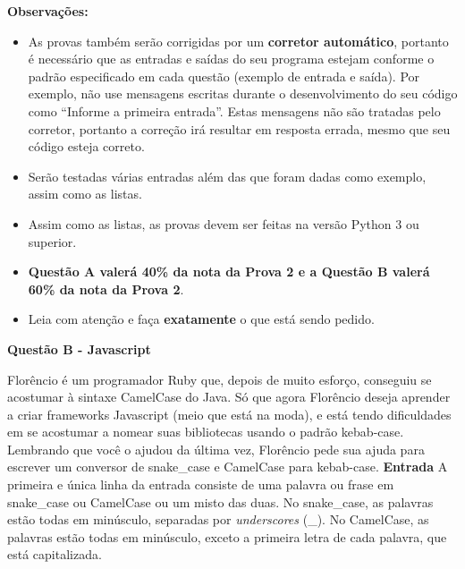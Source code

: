 \documentclass[a4paper, 12pt]{article}
\begin{document}
\textbf{{\large Observações:}}
\begin{itemize}
	\item As provas também serão corrigidas por um \textbf{corretor automático}, portanto é necessário que as entradas e saídas do seu programa estejam conforme o padrão especificado em cada questão (exemplo de entrada e saída). Por exemplo, não use mensagens escritas durante o desenvolvimento do seu código como “Informe a primeira entrada”. Estas mensagens não são tratadas pelo corretor, portanto a correção irá resultar em resposta errada, mesmo que seu código esteja correto.
	\item Serão testadas várias entradas além das que foram dadas como exemplo, assim como as listas.
	\item Assim como as listas, as provas devem ser feitas na versão Python 3 ou superior.
	\item \textbf{Questão A valerá 40\% da nota da Prova 2 e a Questão B valerá 60\% da nota da Prova 2}.
	\item Leia com atenção e faça \textbf{exatamente} o que está sendo pedido.
\end{itemize}
\newpage %
\begin{center}
\textbf{{\Large Questão B - Javascript}}
\end{center}
\vspace{5pt}
Florêncio é um programador Ruby que, depois de muito esforço, conseguiu se
acostumar à sintaxe CamelCase do Java. Só que agora Florêncio deseja aprender a criar frameworks Javascript (meio que está na moda), e está tendo dificuldades em se acostumar a nomear suas
bibliotecas usando o padrão kebab-case. \newline \newline
Lembrando que você o ajudou da última vez, Florêncio pede sua ajuda para
escrever um conversor de snake\_case e CamelCase para kebab-case. \newline \newline
\textbf{{\large Entrada}} \newline
A primeira e única linha da entrada consiste de uma palavra ou frase em
snake\_case ou CamelCase ou um misto das duas.
No snake\_case, as palavras estão todas em minúsculo, separadas por
\textit{underscores} (\_). \newline
No CamelCase, as palavras estão todas em minúsculo, exceto a primeira letra de
cada palavra, que está capitalizada. \newline \newline
\end{document}
